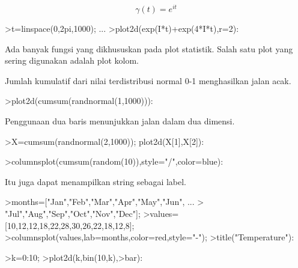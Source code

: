 \documentclass{article}
\begin{document}
\begin{eulernotebook}
\begin{eulercomment}
\begin{eulercomment}
\begin{eulercomment}
\begin{eulercomment}
\begin{eulercomment}
\begin{eulercomment}
\begin{eulercomment}
\end{eulercomment}
\begin{eulerformula}
\[
\gamma(t) = e^{it}
\]
\end{eulerformula}
\begin{eulerprompt}
>t=linspace(0,2pi,1000); ...
>plot2d(exp(I*t)+exp(4*I*t),r=2):
\end{eulerprompt}
\begin{eulercomment}
Ada  banyak  fungsi  yang  dikhususkan  pada  plot  statistik.  Salah
satu  plot  yang  sering  digunakan  adalah  plot  kolom.

Jumlah  kumulatif  dari  nilai  terdistribusi  normal  0-1
menghasilkan jalan  acak.
\end{eulercomment}
\begin{eulerprompt}
>plot2d(cumsum(randnormal(1,1000))):
\end{eulerprompt}
\begin{eulerttcomment}
 Penggunaan  dua  baris  menunjukkan  jalan  dalam  dua  dimensi.
\end{eulerttcomment}
\begin{eulerprompt}
>X=cumsum(randnormal(2,1000)); plot2d(X[1],X[2]):
\end{eulerprompt}
\begin{eulerprompt}
>columnsplot(cumsum(random(10)),style="/",color=blue):
\end{eulerprompt}
\begin{eulerttcomment}
 Itu  juga  dapat  menampilkan  string  sebagai  label.
\end{eulerttcomment}
\begin{eulerprompt}
>months=["Jan","Feb","Mar","Apr","May","Jun", ...
>  "Jul","Aug","Sep","Oct","Nov","Dec"];
>values=[10,12,12,18,22,28,30,26,22,18,12,8];
>columnsplot(values,lab=months,color=red,style="-");
>title("Temperature"):
\end{eulerprompt}
\begin{eulerprompt}
>k=0:10;
>plot2d(k,bin(10,k),>bar):
\end{eulerprompt}
\begin{eulerprompt}

\end{eulerprompt}
\end{eulercomment}
\end{eulercomment}
\end{eulercomment}
\end{eulercomment}
\end{eulercomment}
\end{eulercomment}
\end{eulernotebook}
\end{document}
